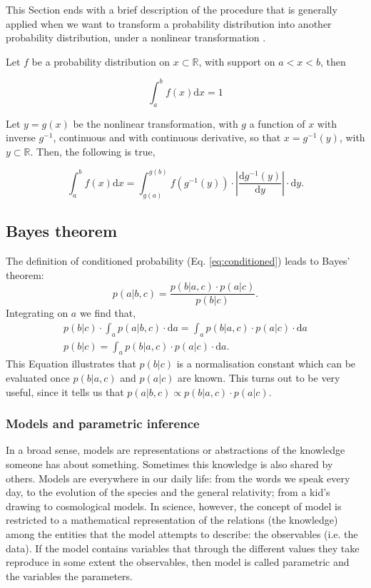 {\color{red}
This Section ends with a brief description of the procedure that is generally applied when we want to transform a probability distribution into another probability distribution, under a nonlinear transformation \cite[for more details see for example][pages 18 and 19]{Bishop2006}. 

Let  $f$ be a probability distribution on $x\subset\mathbb{R}$, with support on $a<x<b$, then

\begin{equation}
\int_a^b f(x) \mathrm{d}x = 1 \nonumber
\end{equation}

Let $y=g(x)$ be the nonlinear transformation, with $g$ a function of $x$ with inverse $g^{-1}$, continuous and with continuous derivative, so that $x=g^{-1}(y)$, with $y\subset \mathbb{R}$. Then, the following is true,

\begin{equation}
\label{eq:transformdistribution}
\int_a^b f(x) \mathrm{d}x = \int_{g(a)}^{g(b)} f(g^{-1}(y))\cdot \left|\frac{\mathrm{d}g^{-1}(y)}{\mathrm{d}y}\right|\cdot \mathrm{d}y.
\end{equation}
}
\subsection{Bayes theorem}
The definition of conditioned probability (Eq. \ref{eq:conditioned}) leads to Bayes' theorem:
\begin{equation}
p(a|b,c) = \frac{p(b|a,c)\cdot p(a|c)}{p(b|c)}.
\end{equation}
Integrating on $a$ we find that,
\begin{align}
\label{eq:evidence}
p(b|c) \cdot \int_a p(a|b,c)\cdot \mathrm{d}a = \int_a p(b|a,c) \cdot p(a|c) \cdot \mathrm{d}a \nonumber \\
p(b|c) = \int_a p(b|a,c) \cdot p(a|c) \cdot \mathrm{d}a.
\end{align}
This Equation illustrates that $p(b|c)$ is a normalisation constant which can be evaluated once $p(b|a,c)$ and $p(a|c)$ are known. This turns out to be very useful, since it tells us that $p(a|b,c) \propto p(b|a,c) \cdot p(a|c)$.

\subsubsection{Models and parametric inference}
\label{sect:parametric_inference}
In a broad sense, models are representations or abstractions of the knowledge someone has about something. Sometimes this knowledge is also shared by others. Models are everywhere in our daily life: from the words we speak every day, to the evolution of the species and the general relativity; from a kid's drawing to cosmological models. In science, however, the concept of model is restricted to a mathematical representation of the relations (the knowledge) among the entities that the model attempts to describe: the observables (i.e. the data). If the model contains variables that through the different values they take reproduce in some extent the observables, then model is called parametric and the variables the parameters. 

